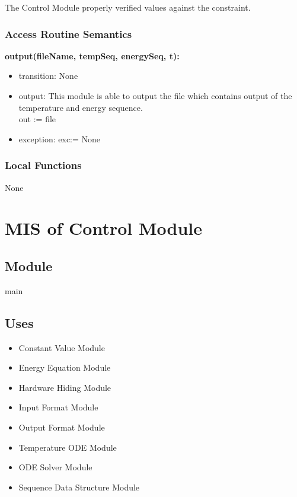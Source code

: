 \documentclass[12pt, titlepage]{article}
\begin{document}
The Control Module properly verified values against the constraint.   

\subsubsection{Access Routine Semantics}

\noindent \textbf{output(fileName, tempSeq, energySeq, t):}
\begin{itemize}
\item transition: None 
\item output: This module is able to output the file which contains output of the temperature and energy sequence.\\  
out := file
\item exception: exc:= None 
\end{itemize}

\subsubsection{Local Functions}

None

\newpage
\section{MIS of Control Module} \label{SCEC_Control_Module} 

\subsection{Module}

main 

\subsection{Uses}

\begin{itemize}
    \item Constant Value Module
    \item Energy Equation Module
    \item Hardware Hiding Module
    \item Input Format Module 
    \item Output Format Module 
    \item Temperature ODE Module
    \item ODE Solver Module
    \item Sequence Data Structure Module
\end{itemize}
\end{document}
